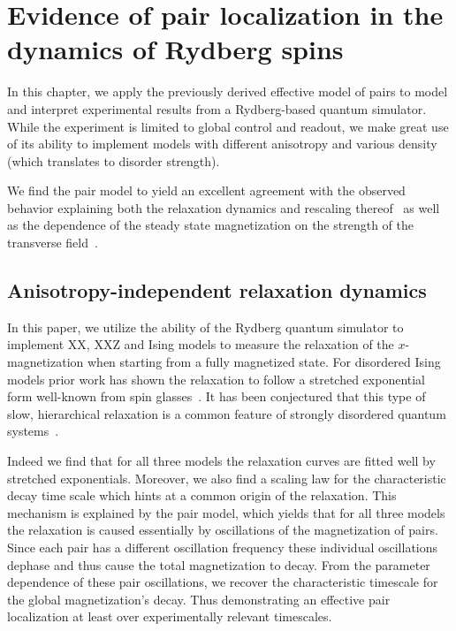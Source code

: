 \chapter{Evidence of pair localization in the dynamics of Rydberg spins}\label{ch:experimental-pairs}

In this chapter, we apply the previously derived effective model of pairs to model and interpret experimental results from a Rydberg-based quantum simulator. While the experiment is limited to global control and readout, we make great use of its ability to implement models with different anisotropy and various density (which translates to disorder strength).

We find the pair model to yield  an excellent agreement with the observed behavior explaining both the relaxation dynamics and rescaling thereof~\cite{franzObservationAnisotropyindependentMagnetization2024} as well as the dependence of the steady state magnetization on the strength of the transverse field~\cite{franzEmergentPairLocalization2022}.


\section{Anisotropy-independent relaxation dynamics}
In this paper, we utilize the ability of the Rydberg quantum simulator to implement XX, XXZ and Ising models to measure the relaxation of the $x$-magnetization when starting from a fully magnetized state. For disordered Ising models prior work has shown the relaxation to follow a stretched exponential form well-known from spin glasses~\cite{breyStretchedExponentialDecay1993,signolesGlassyDynamicsDisordered2021,schultzenGlassyQuantumDynamics2022,schultzenSemiclassicalSimulationsPredict2022}. It has been conjectured that this type of slow, hierarchical relaxation is a common feature of strongly disordered quantum systems~\cite{haldarSlowDynamicsKohlrausch2023}.

Indeed we find that for all three models the relaxation curves are fitted well by stretched exponentials. Moreover, we also find a scaling law for the characteristic decay time scale which hints at a common origin of the relaxation. This mechanism is explained by the pair model, which yields that for all three models the relaxation is caused essentially by oscillations of the magnetization of pairs. Since each pair has a different oscillation frequency these individual oscillations dephase and thus cause the total magnetization to decay. From the parameter dependence of these pair oscillations, we recover the characteristic timescale for the global magnetization's decay. Thus demonstrating an effective pair localization at least over experimentally relevant timescales.

